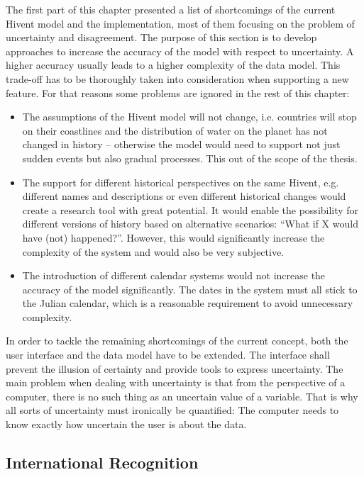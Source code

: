 The first part of this chapter presented a list of shortcomings of the current Hivent model and the implementation, most of them focusing on the problem of uncertainty and disagreement. The purpose of this section is to develop approaches to increase the accuracy of the model with respect to uncertainty. A higher accuracy usually leads to a higher complexity of the data model. This trade-off has to be thoroughly taken into consideration when supporting a new feature. For that reasons some problems are ignored in the rest of this chapter:

\begin{itemize}
  \item The assumptions of the Hivent model will not change, i.e. countries will stop on their coastlines and the distribution of water on the planet has not changed in history -- otherwise the model would need to support not just sudden events but also gradual processes. This out of the scope of the thesis.
  \item The support for different historical perspectives on the same Hivent, e.g. different names and descriptions or even different historical changes would create a research tool with great potential. It would enable the possibility for different versions of history based on alternative scenarios: ``What if X would have (not) happened?''. However, this would significantly increase the complexity of the system and would also be very subjective.
  \item The introduction of different calendar systems would not increase the accuracy of the model significantly. The dates in the system must all stick to the Julian calendar, which is a reasonable requirement to avoid unnecessary complexity.
\end{itemize}

In order to tackle the remaining shortcomings of the current concept, both the user interface and the data model have to be extended. The interface shall prevent the illusion of certainty and provide tools to express uncertainty. The main problem when dealing with uncertainty is that from the perspective of a computer, there is no such thing as an uncertain value of a variable. That is why all sorts of uncertainty must ironically be quantified: The computer needs to know exactly how uncertain the user is about the data.

\subsection{International Recognition} %
\label{sub:international_recognition}

